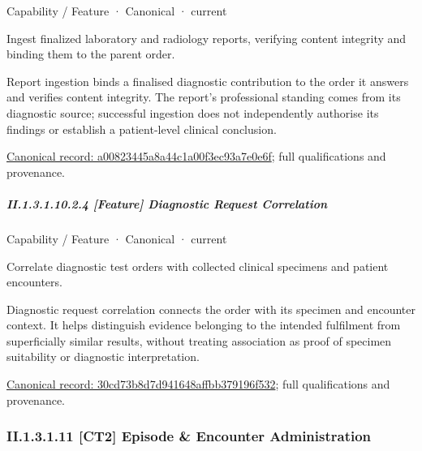 \label{element:a00823445a8a44c1a00f3ec93a7e0e6f}
{\small Capability / Feature · Canonical · current}\par

Ingest finalized laboratory and radiology reports, verifying content integrity and binding them to the parent order.



Report ingestion binds a finalised diagnostic contribution to the order it answers and verifies content integrity. The report's professional standing comes from its diagnostic source; successful ingestion does not independently authorise its findings or establish a patient-level clinical conclusion.


{\footnotesize \href{../../../../continuum/strategy/capability/feature/a00823445a8a44c1a00f3ec93a7e0e6f.md}{Canonical record: a00823445a8a44c1a00f3ec93a7e0e6f}; full qualifications and provenance.}\par
\subparagraph*{II.1.3.1.10.2.4 [Feature] Diagnostic Request Correlation}
\label{navigation:II.1.3.1.10.2.4}

\label{element:30cd73b8d7d941648affbb379196f532}
{\small Capability / Feature · Canonical · current}\par

Correlate diagnostic test orders with collected clinical specimens and patient encounters.



Diagnostic request correlation connects the order with its specimen and encounter context. It helps distinguish evidence belonging to the intended fulfilment from superficially similar results, without treating association as proof of specimen suitability or diagnostic interpretation.


{\footnotesize \href{../../../../continuum/strategy/capability/feature/30cd73b8d7d941648affbb379196f532.md}{Canonical record: 30cd73b8d7d941648affbb379196f532}; full qualifications and provenance.}\par
\subsubsection*{II.1.3.1.11 [CT2] Episode \& Encounter Administration}
\label{navigation:II.1.3.1.11}

